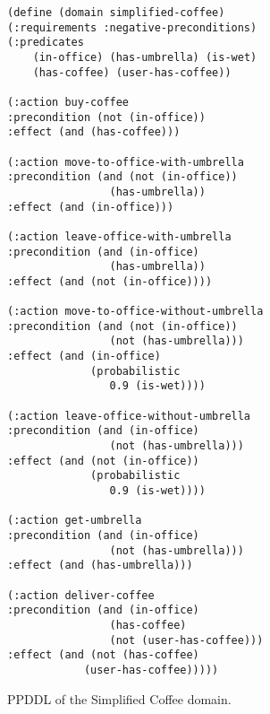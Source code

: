 \documentclass[letterpaper]{article} %
\begin{document}







\begin{figure}
    \centering
\begin{verbatim}
(define (domain simplified-coffee)
(:requirements :negative-preconditions)
(:predicates 
    (in-office) (has-umbrella) (is-wet)
    (has-coffee) (user-has-coffee))

(:action buy-coffee
:precondition (not (in-office))
:effect (and (has-coffee)))

(:action move-to-office-with-umbrella
:precondition (and (not (in-office))
                (has-umbrella))
:effect (and (in-office)))

(:action leave-office-with-umbrella
:precondition (and (in-office)
                (has-umbrella))
:effect (and (not (in-office))))

(:action move-to-office-without-umbrella
:precondition (and (not (in-office))
                (not (has-umbrella)))
:effect (and (in-office)
             (probabilistic 
                0.9 (is-wet))))

(:action leave-office-without-umbrella
:precondition (and (in-office)
                (not (has-umbrella)))
:effect (and (not (in-office))
		     (probabilistic 
		        0.9 (is-wet))))

(:action get-umbrella
:precondition (and (in-office)
                (not (has-umbrella)))
:effect (and (has-umbrella)))

(:action deliver-coffee
:precondition (and (in-office)
                (has-coffee)
                (not (user-has-coffee)))
:effect (and (not (has-coffee) 
            (user-has-coffee)))))
\end{verbatim}
    \caption{PPDDL of the Simplified Coffee domain.}
    \label{fig:coffee-domain}
\end{figure}
\end{document}
